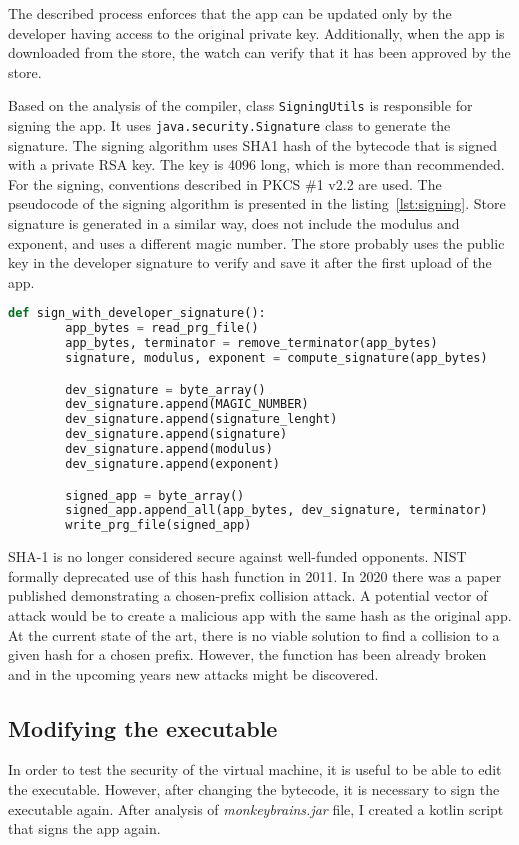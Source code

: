 The described process enforces that the app can be updated only by the developer having access to the original private key.
Additionally, when the app is downloaded from the store, the watch can verify that it has been approved by the store.

Based on the analysis of the compiler, class \texttt{SigningUtils} is responsible for signing the app.
It uses \texttt{java.security.Signature} class to generate the signature.
The signing algorithm uses SHA1 hash of the bytecode that is signed with a private RSA key.
The key is 4096 long, which is more than recommended.
For the signing, conventions described in PKCS \#1 v2.2 are used\cite{java-signature,pkcs}.
The pseudocode of the signing algorithm is presented in the listing~\ref{lst:signing}.
Store signature is generated in a similar way, does not include the modulus and exponent, and uses a different magic number.
The store probably uses the public key in the developer signature to verify and save it after the first upload of the app.
\begin{lstlisting}[caption={Signing algorithm, developer signature},captionpos=b,label={lst:signing},language=Python]
    def sign_with_developer_signature():
        app_bytes = read_prg_file()
        app_bytes, terminator = remove_terminator(app_bytes)
        signature, modulus, exponent = compute_signature(app_bytes)

        dev_signature = byte_array()
        dev_signature.append(MAGIC_NUMBER)
        dev_signature.append(signature_lenght)
        dev_signature.append(signature)
        dev_signature.append(modulus)
        dev_signature.append(exponent)

        signed_app = byte_array()
        signed_app.append_all(app_bytes, dev_signature, terminator)
        write_prg_file(signed_app)
\end{lstlisting}

SHA-1 is no longer considered secure against well-funded opponents.
NIST formally deprecated use of this hash function in 2011.
In 2020 there was a paper published demonstrating a chosen-prefix collision attack.
A potential vector of attack would be to create a malicious app with the same hash as the original app.
At the current state of the art, there is no viable solution to find a collision to a given hash for a chosen prefix.
However, the function has been already broken and in the upcoming years new attacks might be discovered.

\subsection{Modifying the executable}
In order to test the security of the virtual machine, it is useful to be able to edit the executable.
However, after changing the bytecode, it is necessary to sign the executable again.
After analysis of \textit{monkeybrains.jar} file, I created a kotlin script that signs the app again.

